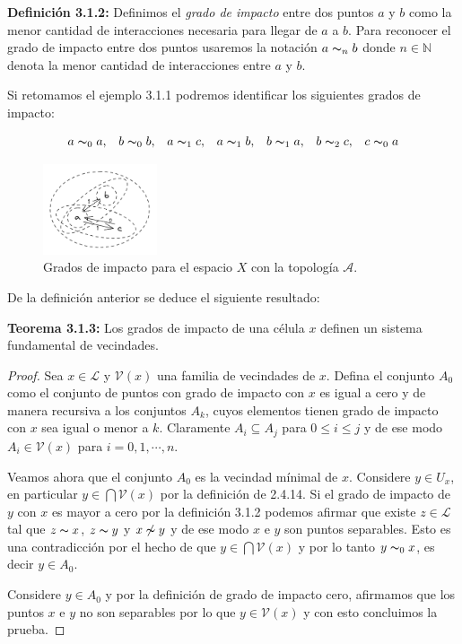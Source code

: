\textbf{Definición 3.1.2:} Definimos el \textit{grado de impacto} entre dos puntos $a$ y $b$ como la menor cantidad de interacciones necesaria para llegar de $a$ a $b$. Para reconocer el grado de impacto entre dos puntos usaremos la notación $a\thicksim_n b$ donde $n\in\mathbb{N}$ denota la menor cantidad de interacciones entre $a$ y $b$.

Si retomamos el ejemplo 3.1.1 podremos identificar los siguientes grados de impacto:

$$\begin{array}{ccccccc}
    a\thicksim_0 a, & b\thicksim_0 b, & a\thicksim_1 c, & a\thicksim_1 b, &
    b\thicksim_1 a, & b\thicksim_2 c, & c\thicksim_0 a
\end{array}$$
\begin{figure}[h]
  \centering
    \includegraphics[width=0.3\textwidth]{Imagenes/grados_de_impacto.PNG}
  \caption{Grados de impacto para el espacio $X$ con la topología $\mathcal{A}$.}
  \label{fig:gradoImpacto}
\end{figure}

De la definición anterior se deduce el siguiente resultado:

\textbf{Teorema 3.1.3:} Los grados de impacto de una célula $x$ definen un sistema fundamental de vecindades.

\begin{proof}
Sea $x\in\mathcal{L}$ y $\mathcal{V}(x)$ una familia de vecindades de $x$. Defina el conjunto $A_0$ como el conjunto de puntos con grado de impacto con $x$ es igual a cero y de manera recursiva a los conjuntos $A_k$, cuyos elementos tienen grado de impacto con $x$ sea igual o menor a $k$. Claramente $A_i\subseteq A_j$ para $0\leq i\leq j$ y de ese modo $A_i\in\mathcal{V}(x)$ para $i=0,1,\cdots,n$.

Veamos ahora que el conjunto $A_0$ es la vecindad mínimal de $x$. Considere $y\in U_x$, en particular $y\in\bigcap\mathcal{V}(x)$ por la definición de 2.4.14. Si el grado de impacto de $y$ con $x$ es mayor a cero por la definición 3.1.2 podemos afirmar que existe $z\in\mathcal{L}$ tal que $z\thicksim x$, $z\thicksim y$ y $x\not\thicksim y$ y de ese modo $x$ e $y$ son puntos separables. Esto es una contradicción por el hecho de que $y\in \bigcap \mathcal{V}(x)$ y por lo tanto $y\thicksim_0 x$, es decir $y\in A_0$.

Considere $y\in A_0$ y por la definición de grado de impacto cero, afirmamos que los puntos $x$ e $y$ no son separables por lo que $y\in\mathcal{V}(x)$ y con esto concluimos la prueba.
\end{proof}

